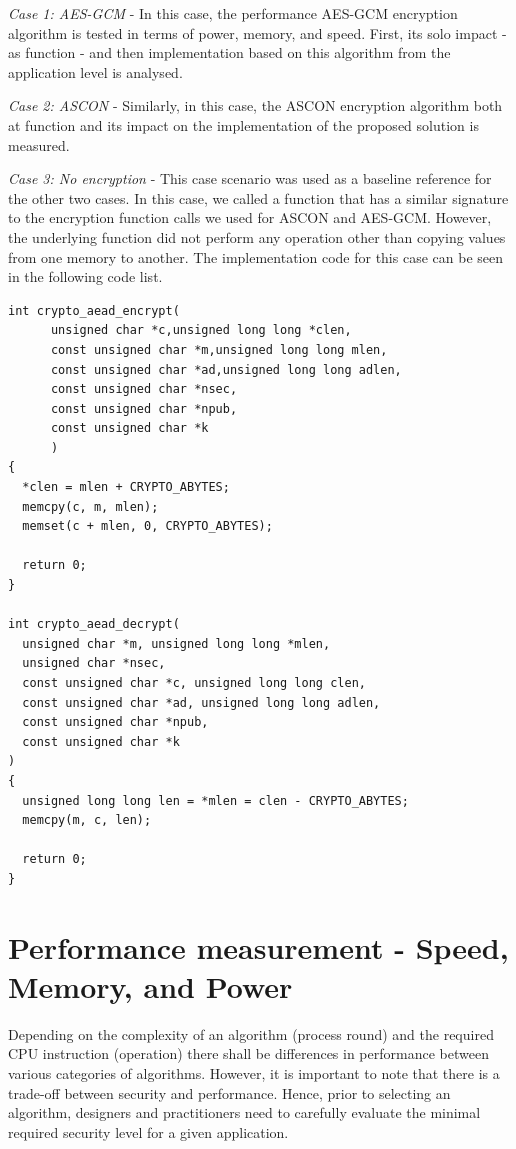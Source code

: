 \textit{Case 1: AES-GCM} - In this case, the performance AES-GCM encryption algorithm is tested in terms of power, memory, and speed. First, its solo impact - as function -  and then implementation based on this algorithm from the application level is analysed.


\textit{Case 2: ASCON} - Similarly, in this case, the ASCON encryption algorithm both at function and its impact on the implementation of the proposed solution is measured. 

\textit{Case 3: No encryption} - This case scenario was used as a baseline reference for the other two cases. In this case, we called a function that has a similar signature to the encryption function calls we used for ASCON and AES-GCM. However, the underlying function did not perform any operation other than copying values from one memory to another. The implementation code for this case can be seen in the following code list.

\begin{lstlisting}[style=CStyle, caption={C Implementation Of No-Encryption - Base Line Reference of Measurement}, label={list:no-enc}]
int crypto_aead_encrypt(
      unsigned char *c,unsigned long long *clen,
      const unsigned char *m,unsigned long long mlen,
      const unsigned char *ad,unsigned long long adlen,
      const unsigned char *nsec,
      const unsigned char *npub,
      const unsigned char *k
      )
{
  *clen = mlen + CRYPTO_ABYTES;
  memcpy(c, m, mlen);
  memset(c + mlen, 0, CRYPTO_ABYTES);

  return 0;
}

int crypto_aead_decrypt(
  unsigned char *m, unsigned long long *mlen,
  unsigned char *nsec,
  const unsigned char *c, unsigned long long clen,
  const unsigned char *ad, unsigned long long adlen,
  const unsigned char *npub,
  const unsigned char *k
)
{
  unsigned long long len = *mlen = clen - CRYPTO_ABYTES;
  memcpy(m, c, len);

  return 0;
} 
\end{lstlisting}


\section{Performance measurement - Speed, Memory, and Power}
Depending on the complexity of an algorithm (process round) and the required CPU instruction (operation) there shall be differences in performance between various categories of algorithms. However, it is important to note that there is a trade-off between security and performance. Hence, prior to selecting an algorithm, designers and practitioners need to carefully evaluate the minimal required security level for a given application. 

